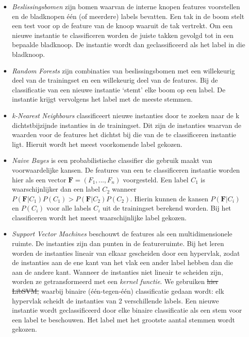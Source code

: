 \documentclass{article}
\providecommand{\DIFadd}[1]{{\protect\color{blue}\uwave{#1}}} %
\providecommand{\DIFdel}[1]{{\protect\color{red}\sout{#1}}}                      %
\providecommand{\DIFaddbegin}{} %
\providecommand{\DIFaddend}{} %
\providecommand{\DIFdelbegin}{} %
\providecommand{\DIFdelend}{} %
\begin{document}
\begin{itemize}
\item \textit{Beslissingsbomen} zijn bomen waarvan de interne knopen features voorstellen en de bladknopen \'e\'en (of meerdere) labels bevatten. Een tak in de boom stelt een test voor op de feature van de knoop waaruit de tak vertrekt. Om een nieuwe instantie te classificeren worden de juiste takken gevolgd tot in een bepaalde bladknoop. De instantie wordt dan geclassificeerd als het label in die bladknoop.
\item \textit{Random Forests} zijn combinaties van beslissingsbomen met een willekeurig deel van de trainingset en een willekeurig deel van de features. Bij de classificatie van een nieuwe instantie `stemt' elke boom op een label. De instantie krijgt vervolgens het label met de meeste stemmen.
\item \textit{k-Nearest Neighbours} classificeert nieuwe instanties door te zoeken naar de k dichtstbijzijnde instanties in de trainingset. Dit zijn de instanties waarvan de waarden voor de features het dichtst bij die van de te classificeren instantie ligt. Hieruit wordt het meest voorkomende label gekozen.
\item \textit{Naive Bayes} is een probabilistische classifier die gebruik maakt van voorwaardelijke kansen. De features van een te classificeren instantie worden hier als een vector $\mathbf{F} = (F_1, ..., F_n)$ voorgesteld. Een label $C_1$ is waarschijnlijker dan een label $C_2$ wanneer $P(\mathbf{F}|C_1) P(C_1) > P(\mathbf{F}|C_2) P(C_2)$. Hierin kunnen de kansen $P(\mathbf{F}|C_i)$ en $P(C_i)$ voor alle labels $C_i$ uit de trainingset berekend worden. Bij het classificeren wordt het meest waarschijnlijke label gekozen.
\item \textit{Support Vector Machines} beschouwt de features als een multidimensionele ruimte. De instanties zijn dan punten in de featureruimte. Bij het leren worden de instanties lineair van elkaar gescheiden door een hypervlak, zodat de instanties aan de ene kant van het vlak een ander label hebben dan die aan de andere kant. Wanneer de instanties niet lineair te scheiden zijn, worden ze getransformeerd met een \textit{kernel functie}. We gebruiken \DIFdelbegin \DIFdel{hier LibSVM,
}\DIFdelend \DIFaddbegin \DIFadd{in dit onderzoek LibSVM,
}\DIFaddend waarbij binaire (\'e\'en-tegen-\'e\'en) classificatie gedaan wordt: elk hypervlak scheidt de instanties van 2 verschillende labels. Een nieuwe instantie wordt geclassificeerd door elke binaire classificatie als een stem voor een label te beschouwen. Het label met het grootste aantal stemmen wordt gekozen.
\end{itemize}
\end{document}

